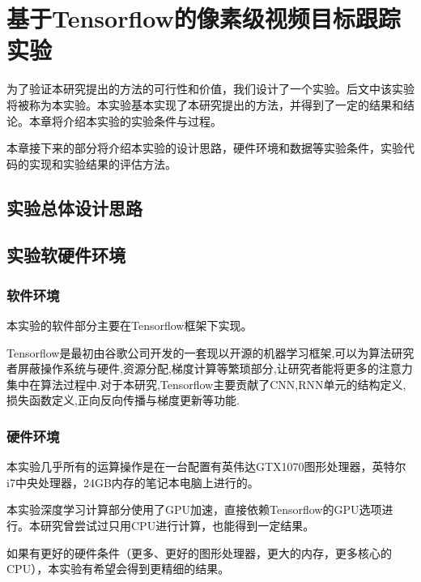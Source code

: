 \chapter{基于Tensorflow的像素级视频目标跟踪实验}
为了验证本研究提出的方法的可行性和价值，我们设计了一个实验。后文中该实验将被称为本实验。本实验基本实现了本研究提出的方法，并得到了一定的结果和结论。本章将介绍本实验的实验条件与过程。
\par
本章接下来的部分将介绍本实验的设计思路，硬件环境和数据等实验条件，实验代码的实现和实验结果的评估方法。

\section{实验总体设计思路}


\section{实验软硬件环境}
\subsection{软件环境}
本实验的软件部分主要在Tensorflow\supercite{abadi2016tensorflow}框架下实现。
\par
Tensorflow是最初由谷歌公司开发的一套现以开源的机器学习框架,可以为算法研究者屏蔽操作系统与硬件,资源分配,梯度计算等繁琐部分,让研究者能将更多的注意力集中在算法过程中.对于本研究,Tensorflow主要贡献了CNN,RNN单元的结构定义,损失函数定义,正向反向传播与梯度更新等功能.
\par

\subsection{硬件环境}
本实验几乎所有的运算操作是在一台配置有英伟达GTX1070图形处理器，英特尔i7中央处理器，24GB内存的笔记本电脑上进行的。
\par
本实验深度学习计算部分使用了GPU加速，直接依赖Tensorflow的GPU选项进行。本研究曾尝试过只用CPU进行计算，也能得到一定结果。
\par
如果有更好的硬件条件（更多、更好的图形处理器，更大的内存，更多核心的CPU），本实验有希望会得到更精细的结果。

